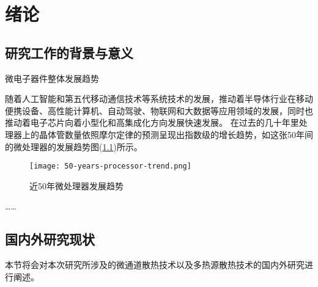     
\chapter{绪论}\label{ch:1}
\section{研究工作的背景与意义}

\begin{shaded}
    微电子器件整体发展趋势  
    \end{shaded}
    随着人工智能和第五代移动通信技术等系统技术的发展\cite{Lau_2022}，推动着半导体行业在移动便携设备、高性能计算机、自动驾驶、物联网和大数据等应用领域的发展\cite{Lau_2022}，同时也推动着电子芯片向着小型化和高集成化方向发展快速发展\cite{Sadique.Murtaza.ea_2022}。
在过去的几十年里处理器上的晶体管数量依照摩尔定律\cite{Tan.Du.ea_2021}的预测呈现出指数级的增长趋势，如这张50年间的微处理器的发展趋势图(\cref{fig:processor-trend})所示。

\begin{figure}[htb]
    \texttt{[image: 50-years-processor-trend.png]}
    \caption{近50年微处理器发展趋势}
    \label{fig:processor-trend}
\end{figure}
……

\section{国内外研究现状}
本节将会对本次研究所涉及的微通道散热技术以及多热源散热技术的国内外研究进行阐述。
